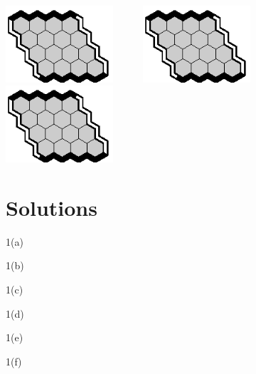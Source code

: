 \documentclass[12pt]{article}
\begin{document}
\begin{center}
\includegraphics[width=40mm]{fz/pix/4x4.eps}~~~~~~\includegraphics[width=40mm]{fz/pix/4x4.eps}~~~~~~\includegraphics[width=40mm]{fz/pix/4x4.eps}
\end{center}
\newpage
\section*{Solutions}
1(a)

\vfill

1(b)

\vfill

1(c)

\vfill

1(d)

\vfill

1(e)

\vfill

1(f)
\end{document}
